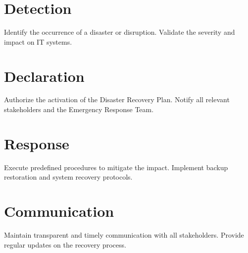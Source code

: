 \section{Detection}

Identify the occurrence of a disaster or disruption.
Validate the severity and impact on IT systems.

\section{Declaration}

Authorize the activation of the Disaster Recovery Plan.
Notify all relevant stakeholders and the Emergency Response Team.

\section{Response}

Execute predefined procedures to mitigate the impact.
Implement backup restoration and system recovery protocols.

\section{Communication}

Maintain transparent and timely communication with all stakeholders.
Provide regular updates on the recovery process.